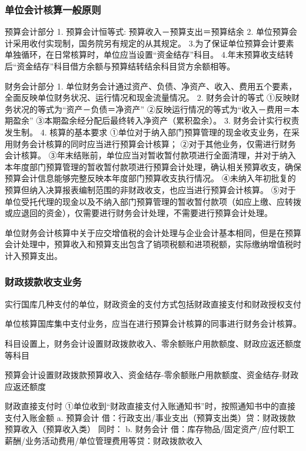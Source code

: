 \documentclass[UTF8,12pt]{ctexart}
\numberwithin{equation}{section} %
\numberwithin{figure}{section}
\numberwithin{table}{section}
\begin{document}
	\subsubsection{单位会计核算一般原则}
	预算会计部分
	1.	预算会计恒等式:
	预算收入－预算支出＝预算结余
	2.	单位预算会计采用收付实现制，国务院另有规定的从其规定。
	3.为了保证单位预算会计要素单独循环，在日常核算时，单位应当设置“资金结存”科目。
	4.年末预算收支结转后“资金结存”科目借方余额与预算结转结余科目贷方余额相等。
	
	
	财务会计部分
	1.	单位财务会计通过资产、负债、净资产、收入、费用五个要素，全面反映单位财务状况、运行情况和现金流量情况。
	2.	财务会计的等式
	①反映财务状况的等式为“资产－负债＝净资产”
	②反映运行情况的等式为“收入－费用＝本期盈余”
	③本期盈余经分配后最终转入净资产（累积盈余）。
	3.	财务会计实行权责发生制。
	4.	核算的基本要求
	①单位对于纳入部门预算管理的现金收支业务，在采用财务会计核算的同时应当进行预算会计核算；
	②对于其他业务，仅需进行财务会计核算。
	③年末结账前，单位应当对暂收暂付款项进行全面清理，并对于纳入本年度部门预算管理的暂收暂付款项进行预算会计处理，确认相关预算收支，确保预算会计信息能够完整反映本年度部门预算收支执行情况。
	④未纳入年初批复的预算但纳入决算报表编制范围的非财政收支，也应当进行预算会计核算。
	⑤对于单位受托代理的现金以及不纳入部门预算管理的暂收暂付款项（如应上缴、应转拨或应退回的资金），仅需要进行财务会计处理，不需要进行预算会计处理。
	
	单位财务会计核算中关于应交增值税的会计处理与企业会计基本相同，但是在预算会计处理中，预算收入和预算支出包含了销项税额和进项税额，实际缴纳增值税时计入预算支出。
	
	\subsubsection{财政拨款收支业务}
	实行国库几种支付的单位，财政资金的支付方式包括财政直接支付和财政授权支付
	
	单位核算国库集中支付业务，应当在进行预算会计核算的同事进行财务会计核算。
	
	科目设置上，财务会计设置财政拨款收入、零余额账户用款额度、财政应返还额度等科目
	
	预算会计设置财政拨款预算收入、资金结存-零余额账户用款额度、资金结存-财政应返还额度
	
	财政直接支付时
	①单位收到“财政直接支付入账通知书”时，按照通知书中的直接支付入账金额
	a.	预算会计
	借：行政支出/事业支出（预算支出类）贷：财政拨款预算收入（预算收入类）
	同时：
	b.	财务会计
	借：库存物品/固定资产/应付职工薪酬/业务活动费用/单位管理费用等贷：财政拨款收入
	
\end{document}
